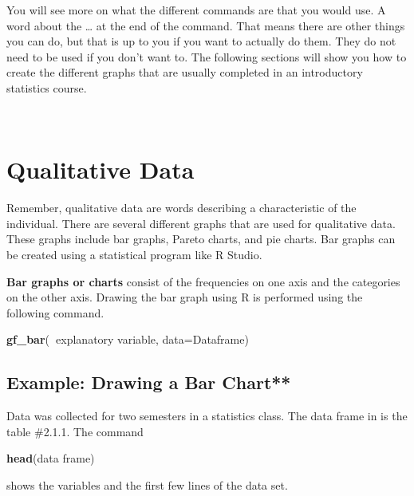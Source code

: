 \documentclass[
]{book}
\newenvironment{Shaded}{\begin{snugshade}}{\end{snugshade}}
\newcommand{\DataTypeTok}[1]{\textcolor[rgb]{0.13,0.29,0.53}{#1}}
\newcommand{\KeywordTok}[1]{\textcolor[rgb]{0.13,0.29,0.53}{\textbf{#1}}}
\newcommand{\NormalTok}[1]{#1}
\newcommand{\OperatorTok}[1]{\textcolor[rgb]{0.81,0.36,0.00}{\textbf{#1}}}
\begin{document}
You will see more on what the different commands are that you would use. A word about the \ldots{} at the end of the command. That means there are other things you can do, but that is up to you if you want to actually do them. They do not need to be used if you don't want to. The following sections will show you how to create the different graphs that are usually completed in an introductory statistics course.

\emph{\\
}

\hypertarget{qualitative-data}{%
\section{Qualitative Data}\label{qualitative-data}}

Remember, qualitative data are words describing a characteristic of the individual. There are several different graphs that are used for qualitative data. These graphs include bar graphs, Pareto charts, and pie charts. Bar graphs can be created using a statistical program like R Studio.

\textbf{Bar graphs or charts} consist of the frequencies on one axis and the categories on the other axis. Drawing the bar graph using R is performed using the following command.

\begin{Shaded}
\begin{Highlighting}[]
\KeywordTok{gf_bar}\NormalTok{(}\OperatorTok{~}\NormalTok{explanatory variable, }\DataTypeTok{data=}\NormalTok{Dataframe)}
\end{Highlighting}
\end{Shaded}

\hypertarget{example-drawing-a-bar-chart}{%
\subsection{Example: Drawing a Bar Chart**}\label{example-drawing-a-bar-chart}}

Data was collected for two semesters in a statistics class. The data frame in is the table \#2.1.1. The command

\begin{Shaded}
\begin{Highlighting}[]
\KeywordTok{head}\NormalTok{(data frame) }
\end{Highlighting}
\end{Shaded}

shows the variables and the first few lines of the data set.
\end{document}
